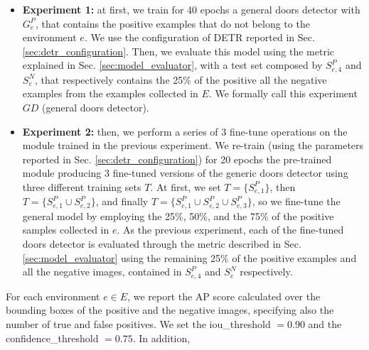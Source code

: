 \begin{itemize}
	\item \textbf{Experiment 1:} at first, we train for 40 epochs a general doors detector with $G^{P}_e$, that contains the positive examples that do not belong to the environment $e$. We use the configuration of DETR reported in Sec. \ref{sec:detr_configuration}. Then, we evaluate this model using the metric explained in Sec. \ref{sec:model_evaluator}, with a test set composed by $S^{P}_{e, 4}$ and $S^{N}_e$, that respectively contains the 25\% of the positive all the negative examples from the examples collected in $E$. We formally call this experiment $GD$ (general doors detector). 
	
	\item \textbf{Experiment 2:} then, we perform a series of 3 fine-tune operations on the module trained in the previous experiment. We re-train (using the parameters reported in Sec. \ref{sec:detr_configuration}) for 20 epochs  the pre-trained module producing 3 fine-tuned versions of the generic doors detector using three different training sets $T$. At first, we set $ T= \big\{S^{P}_{e, 1}\big\}$, then $T=\big\{S^{P}_{e, 1} \cup S^{P}_{e, 2}\big\}$, and finally $T=\big\{S^{P}_{e, 1} \cup S^{P}_{e, 2} \cup S^{P}_{e, 3}\big\}$, so we fine-tune the general model by employing the  25\%, 50\%, and the 75\% of the positive samples collected in $e$. As the previous experiment, each of the fine-tuned doors detector is evaluated through the metric described in Sec. \ref{sec:model_evaluator} using the remaining 25\% of the positive examples and all the negative images, contained in $S^{P}_{e, 4}$ and $S^{N}_e$ respectively.

\end{itemize}

For each environment $e \in E$, we report the AP score calculated over the bounding boxes of the positive and the negative images, specifying also the number of true and false positives. We set the \textsf{iou\_threshold} $= 0.90$ and the \textsf{confidence\_threshold} $= 0.75$. In addition,  

